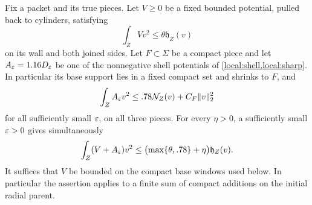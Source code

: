 \begin{lemma}\label{shield:maximum}
Fix a packet and its true pieces.  Let $V\ge0$ be a fixed bounded
potential, pulled back to cylinders, satisfying
\begin{equation}\label{shield:old-bound}
 \int_Z Vv^2\le\theta\mathfrak h_Z(v)
\end{equation}
on its wall and both joined sides.  Let $F\subset\Sigma$ be a compact
piece and let $A_\varepsilon=1.16D_\varepsilon$ be one of the nonnegative shell
potentials of \cref{local:shell,local:sharp}.  In particular its base
support lies in a fixed compact set and shrinks to $F$, and
\begin{equation}\label{shield:local-input}
 \int_Z A_\varepsilon v^2\le .78\mathcal N_Z(v)+C_F\lVert v\rVert_2^2
\end{equation}
for all sufficiently small $\varepsilon$, on all three pieces.
For every $\eta>0$, a sufficiently small $\varepsilon>0$ gives simultaneously
\begin{equation}\label{shield:maximum-bound}
 \int_Z(V+A_\varepsilon)v^2
 \le\bigl(\max\{\theta,.78\}+\eta\bigr)\mathfrak h_Z(v).
\end{equation}
It suffices that $V$ be bounded on the compact base windows used below.
In particular the assertion applies to a finite sum of compact
additions on the initial radial parent.
\end{lemma}

